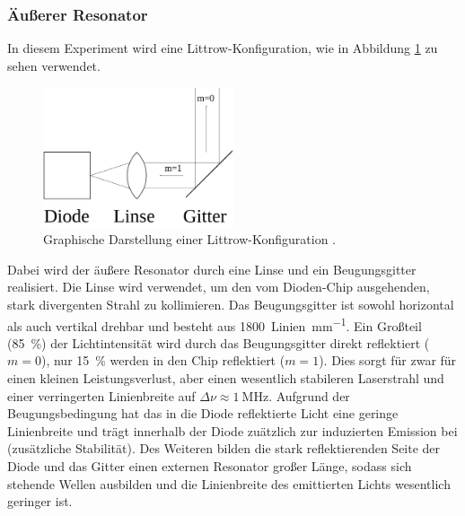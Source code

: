 \subsubsection{Äußerer Resonator}
In diesem Experiment wird eine Littrow-Konfiguration, wie in Abbildung \ref{Littrow}
zu sehen verwendet.
\begin{figure}[htb]
  \centering
  \includegraphics[width=0.5\textwidth]{images/Littrow-Konfig.pdf}
  \caption{Graphische Darstellung einer Littrow-Konfiguration \cite{Littrow-Konfig}.}
  \label{Littrow}
\end{figure}

Dabei wird der äußere Resonator durch eine Linse
und ein Beugungsgitter realisiert. Die Linse wird
verwendet, um den vom Dioden-Chip ausgehenden, stark divergenten Strahl zu
kollimieren. Das Beugungsgitter ist sowohl horizontal als auch vertikal drehbar
und besteht aus \SI{1800}{Linien\per\milli\meter}.
Ein Großteil (\SI{85}{\percent}) der Lichtintensität wird durch das Beugungsgitter
direkt reflektiert ($m=\num{0}$), nur \SI{15}{\percent} werden in den Chip reflektiert
($m=\num{1}$). Dies sorgt für zwar für einen kleinen Leistungsverlust, aber einen
wesentlich stabileren Laserstrahl und einer verringerten Linienbreite auf
$\Delta\nu\approx\SI{1}{\mega\hertz}$.
Aufgrund der Beugungsbedingung hat das in die Diode reflektierte Licht eine geringe
Linienbreite und trägt innerhalb der Diode zuätzlich zur induzierten Emission
bei (zusätzliche Stabilität).
Des Weiteren bilden die stark reflektierenden Seite der Diode und das
Gitter einen externen Resonator großer Länge, sodass sich stehende Wellen
ausbilden und die Linienbreite des emittierten Lichts wesentlich geringer ist.


